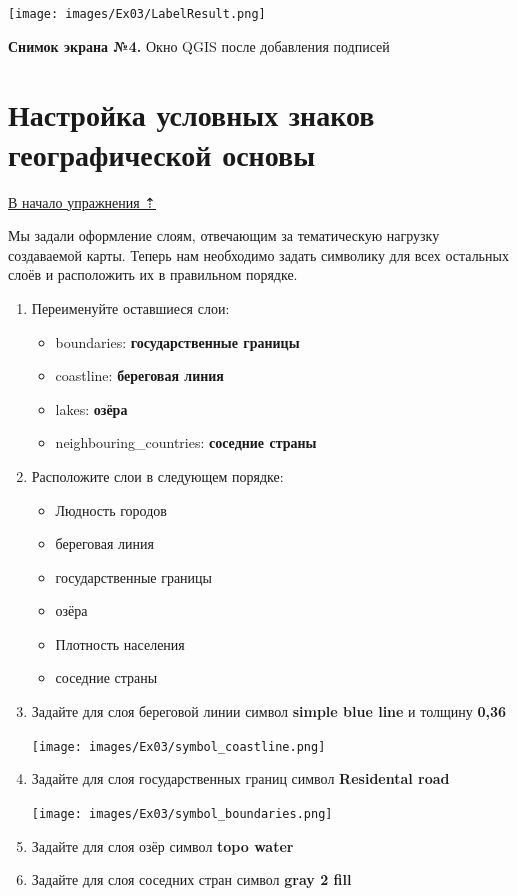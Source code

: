 \documentclass[
  12pt,
]{book}
\providecommand{\tightlist}{%
  \setlength{\itemsep}{0pt}\setlength{\parskip}{0pt}}
\begin{document}
\texttt{[image: images/Ex03/LabelResult.png]}

\textbf{Снимок экрана №4.} Окно QGIS после добавления подписей

\hypertarget{map-design-population-basemap}{%
\section{Настройка условных знаков географической основы}\label{map-design-population-basemap}}

\protect\hyperlink{map-design-population}{В начало упражнения ⇡}

Мы задали оформление слоям, отвечающим за тематическую нагрузку создаваемой карты. Теперь нам необходимо задать символику для всех остальных слоёв и расположить их в правильном порядке.

\begin{enumerate}
\def\labelenumi{\arabic{enumi}.}
\item
  Переименуйте оставшиеся слои:

  \begin{itemize}
  \tightlist
  \item
    boundaries: \textbf{государственные границы}
  \item
    coastline: \textbf{береговая линия}
  \item
    lakes: \textbf{озёра}
  \item
    neighbouring\_countries: \textbf{соседние страны}
  \end{itemize}
\item
  Расположите слои в следующем порядке:

  \begin{itemize}
  \tightlist
  \item
    Людность городов
  \item
    береговая линия
  \item
    государственные границы
  \item
    озёра
  \item
    Плотность населения
  \item
    соседние страны
  \end{itemize}
\item
  Задайте для слоя береговой линии символ \textbf{simple blue line} и толщину \textbf{0,36}

  \texttt{[image: images/Ex03/symbol\_coastline.png]}
\item
  Задайте для слоя государственных границ символ \textbf{Residental road}

  \texttt{[image: images/Ex03/symbol\_boundaries.png]}
\item
  Задайте для слоя озёр символ \textbf{topo water}
\item
  Задайте для слоя соседних стран символ \textbf{gray 2 fill}
\end{enumerate}
\end{document}
